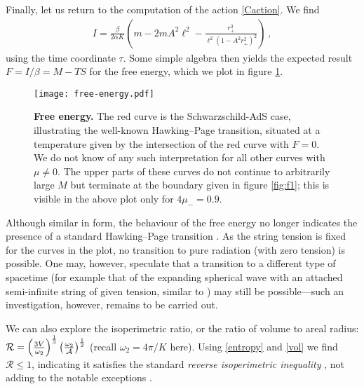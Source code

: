 \documentclass[
twoside,
openright,
frontopenright
]{dmathesis}
\begin{document}
Finally, let us return to the computation of the action \eqref{Caction}.
We find
\begin{align}
I = \frac{\beta}{2\alpha K} \left( m - 2mA^2\ell^2
- \frac{r_+^3}{\ell^2(1-A^2r_+^2)^2} \right)\,,
\label{Caction}
\end{align}
using the time coordinate $\tau$. Some simple algebra then yields the
expected result $F=I/\beta=M-TS$
for the free energy, which we plot in figure \ref{fig:FE}.
\begin{figure}[tbp]
\centering
\texttt{[image: free-energy.pdf]}
\caption{\textbf{Free energy.}
The red curve is the Schwarzschild-AdS case, illustrating the
well-known Hawking--Page transition,  situated at a temperature
given by the intersection of the red curve with $F=0$. We do
not know of any such interpretation for all other curves with $\mu\neq 0$.
The upper parts of these curves do not continue to arbitrarily large $M$
but terminate at the boundary given in figure
\ref{fig:f1}; this is visible in the above plot only for $4\mu_- =0.9$.   }
\label{fig:FE}
\end{figure}

Although similar in form, the behaviour of the free energy no longer indicates
the presence of a standard Hawking--Page transition \cite{Hawking:1982dh}.
As the string tension is fixed for the curves in the plot, no transition to
pure radiation (with zero tension) is possible. One may, however, speculate that
a transition to a different type of spacetime (for example {that of the expanding spherical wave with an attached semi-infinite string of given tension, similar to} \cite{Podolsky:2004bk})
may still be possible---such an investigation, however, remains to be carried out.

We can also explore the isoperimetric ratio, or the ratio of volume to
areal radius: $\mathcal{R}=\left( \frac{3{V}}{\omega _{2}}\right)^{\frac{1}{3}}
\left(\frac{\omega _{2}}{{\cal A}}\right) ^{\frac{1}{2}}$ (recall $\omega_2=4\pi/K$
here). Using \eqref{entropy} and \eqref{vol} we find $\mathcal{R}\leq 1$,
indicating it satisfies the standard {\em reverse isoperimetric inequality}
\cite{Cvetic:2010jb}, not adding to the notable exceptions
\cite{Hennigar:2014cfa,Hennigar:2015cja,Brenna:2015pqa}.
\end{document}
